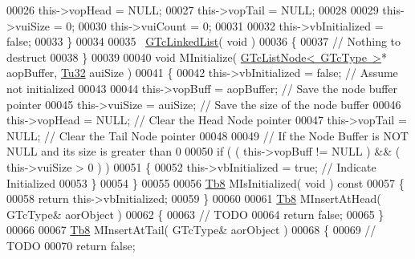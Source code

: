 \begin{DoxyCode}
00026             this->vopHead = NULL;
00027             this->vopTail = NULL;
00028 
00029             this->vuiSize  = 0;
00030             this->vuiCount = 0;
00031 
00032             this->vbInitialized = \textcolor{keyword}{false};
00033          \}
00034 
00035          ~\mbox{\hyperlink{class_g_n_common_1_1_n_containers_1_1_g_tc_linked_list}{GTcLinkedList}}( \textcolor{keywordtype}{void} )
00036          \{
00037             \textcolor{comment}{// Nothing to destruct}
00038          \}
00039 
00040          \textcolor{keywordtype}{void} MInitialize( \mbox{\hyperlink{class_g_n_common_1_1_n_containers_1_1_g_tc_list_node}{GTcListNode< GTcType >}}* aopBuffer, 
      \mbox{\hyperlink{namespace_g_n_common_a941b527ef318f318aed7903dc832b7e4}{Tu32}} auiSize )
00041          \{
00042             this->vbInitialized = \textcolor{keyword}{false};  \textcolor{comment}{// Assume not initialized}
00043 
00044             this->vopBuff = aopBuffer; \textcolor{comment}{// Save the node buffer pointer}
00045             this->vuiSize = auiSize;   \textcolor{comment}{// Save the size of the node buffer}
00046             this->vopHead = NULL;      \textcolor{comment}{// Clear the Head Node pointer}
00047             this->vopTail = NULL;      \textcolor{comment}{// Clear the Tail Node pointer}
00048 
00049                                        \textcolor{comment}{// If the Node Buffer is NOT NULL and its size is greater than 0}
00050             \textcolor{keywordflow}{if} ( ( this->vopBuff != NULL ) && ( this->vuiSize > 0 ) )
00051             \{
00052                this->vbInitialized = \textcolor{keyword}{true}; \textcolor{comment}{// Indicate Initialized}
00053             \}
00054          \}
00055 
00056          \mbox{\hyperlink{namespace_g_n_common_a8115dc7ed53b6e5b52e6bfde1632ea74}{Tb8}} MIsInitialized( \textcolor{keywordtype}{void} )\textcolor{keyword}{ const}
00057 \textcolor{keyword}{         }\{
00058             \textcolor{keywordflow}{return} this->vbInitialized;
00059          \}
00060 
00061          \mbox{\hyperlink{namespace_g_n_common_a8115dc7ed53b6e5b52e6bfde1632ea74}{Tb8}} MInsertAtHead( GTcType& aorObject )
00062          \{
00063             \textcolor{comment}{// TODO}
00064             \textcolor{keywordflow}{return} \textcolor{keyword}{false};
00065          \}
00066 
00067          \mbox{\hyperlink{namespace_g_n_common_a8115dc7ed53b6e5b52e6bfde1632ea74}{Tb8}} MInsertAtTail( GTcType& aorObject )
00068          \{
00069             \textcolor{comment}{// TODO}
00070             \textcolor{keywordflow}{return} \textcolor{keyword}{false};

\end{DoxyCode}
